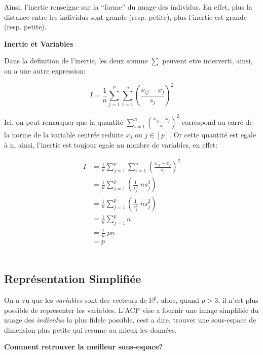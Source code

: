 \documentclass{article}
\begin{document}
Ainsi, l’inertie renseigne sur la ``forme'' du nuage des individus. En effet, plus la distance entre les individus sont grande (resp. petite), plus l'inertie est grande (resp. petite).

\begin{flushleft}
\textbf{Inertie et Variables}
\end{flushleft}

Dans la definition de l'inertie, les deux somme $\sum$ peuvent etre interverti, ainsi, on a une autre expression:

\begin{equation*}
I = \frac{1}{n} \sum_{j=1}^p \sum_{i=1}^n {\left( \frac{x_{ij}-\bar{x}_j}{s_j} \right)}^2
\end{equation*}

Ici, on peut remarquer que la quantité $\sum_{i=1}^n {\left( \frac{x_{ij}-\bar{x}_j}{s_j} \right)}^2$ correspond au carré de la norme de la variable centrée reduite $x_j$ ou $j \in [p]$. Or cette quantité est egale à n, ainsi, l'inertie est toujour egale au nombre de variables, en effet:

\begin{align*}
I &= \frac{1}{n} \sum_{j=1}^p \sum_{i=1}^n {\left( \frac{x_{ij}-\bar{x}_j}{s_j} \right)}^2 \\
  &= \frac{1}{n} \sum_{j=1}^p \left( \frac{1}{s_j^2} \; n{s_j^2} \right) \\  
  &= \frac{1}{n} \sum_{j=1}^p \left( \frac{1}{s_j^2} \; n{s_j^2} \right) \\
  &= \frac{1}{n} \sum_{j=1}^p n \\
  &= \frac{1}{n} \; pn \\
  &= p
\end{align*}
\\

\subsection{Représentation Simplifiée}

On a vu que les \textit{variables} sont des vecteurs de $\mathbb{R}^p$, alors, quand $p > 3$, il n'est plus possible de representer les variables. L'ACP vise a fournir une image simplifiée du nuage des \textit{individus} la plus fidele possible, cest a dire, trouver une sous-espace de dimension plus petite qui resume au mieux les données.
\newline

\newpage

\begin{flushleft}
\textbf{Comment retrouver la meilleur sous-espace?}
\end{flushleft}
\end{document}

